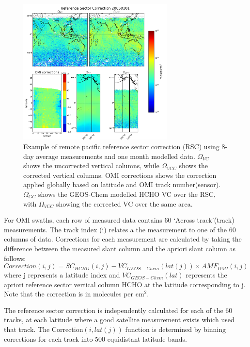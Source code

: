     \begin{figure}[!htbp]\begin{center}
      \includegraphics[width=0.7\textwidth]{Figures/HCHO/Summary_RSC_Effect8d_20050101.png}
      \caption{ %
	Example of remote pacific reference sector correction (RSC) using 8-day average measurements and one month modelled data.
	$\Omega_{VC}$ shows the uncorrected vertical columns, while $\Omega_{VCC}$ shows the corrected vertical columns.
	OMI corrections shows the correction applied globally based on latitude and OMI track number(sensor).
	$\Omega_{GC}$ shows the GEOS-Chem modelled HCHO VC over the RSC, with $\Omega_{VCC}$ showing the corrected VC over the same area.
      }
      \label{ch_HCHO:fig:Summary_RSC}
    \end{center}\end{figure}
    
    For OMI swaths, each row of measured data contains 60 `Across track'(track) measurements.
    The track index (i) relates a the measurement to one of the 60 columns of data.
    Corrections for each measurement are calculated by taking the difference between the measured slant column and the apriori slant column as follows:
    \begin{equation} \label{ch_HCHO:eqn:reference_sector_correction}
      Correction(i,j) = SC_{HCHO}(i,j) - VC_{GEOS-Chem}(lat(j)) \times {AMF_{OMI}}(i,j)
    \end{equation}
    where j represents a latitude index and $VC_{GEOS-Chem}(lat)$ represents the apriori reference sector vertical column HCHO at the latitude corresponding to j.
    Note that the correction is in molecules per cm$^2$.
    
    The reference sector correction is independently calculated for each of the 60 tracks, at each latitude where a good satellite measurement exists which used that track.
    The Correction$(i,lat(j))$ function is determined by binning corrections for each track into 500 equidistant latitude bands. 
    
